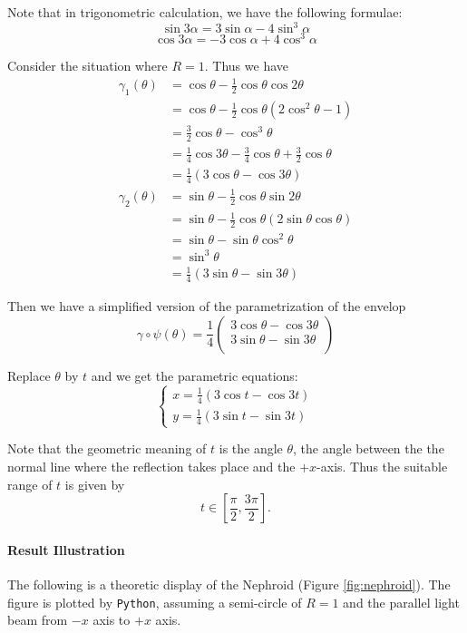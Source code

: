 \documentclass[a4paper]{article}
\begin{document}
Note that in trigonometric calculation, we have the following formulae:
$$\sin 3\alpha = 3\sin \alpha - 4 \sin^3 \alpha$$
$$\cos 3\alpha = -3\cos \alpha + 4 \cos^3 \alpha$$

Consider the situation where $R=1$. Thus we have
\begin{align*}
\gamma_1(\theta) &= \cos \theta - \frac{1}{2}\cos \theta \cos 2\theta\\
&= \cos \theta - \frac{1}{2}\cos \theta (2\cos^2 \theta -1)\\
&= \frac{3}{2}\cos \theta - \cos^3 \theta\\
&= \frac{1}{4}\cos 3\theta -\frac{3}{4}\cos \theta + \frac{3}{2}\cos \theta\\
&= \frac{1}{4}(3\cos \theta - \cos 3\theta)
\end{align*}
\begin{align*}
\gamma_2(\theta) &= \sin \theta - \frac{1}{2}\cos \theta \sin 2\theta\\
&= \sin \theta - \frac{1}{2}\cos \theta (2\sin \theta \cos \theta)\\
&= \sin \theta - \sin \theta \cos^2 \theta\\
&= \sin^3 \theta\\
&= \frac{1}{4}(3\sin \theta - \sin 3\theta)
\end{align*}

Then we have a simplified version of the parametrization of the envelop
$$\gamma \circ \psi(\theta) = \frac{1}{4}
\begin{pmatrix}
3\cos \theta - \cos 3\theta\\
3\sin \theta - \sin 3\theta\\
\end{pmatrix}$$

Replace $\theta$ by $t$ and we get the parametric equations:
\begin{equation*}
\left\lbrace
	\begin{aligned}
	x = \frac{1}{4}(3\cos t - \cos 3t)\\
	y = \frac{1}{4}(3\sin t - \sin 3t)
	\end{aligned}
\right.
\end{equation*}

Note that the geometric meaning of $t$ is the angle $\theta$, the angle between the the normal line where the reflection takes place and the $+x$-axis. Thus the suitable range of $t$ is given by 
$$t \in [\frac{\pi}{2},\frac{3\pi}{2}].$$

\paragraph{Result Illustration}
The following is a theoretic display of the Nephroid (Figure \ref{fig:nephroid}). The figure is plotted by \texttt{Python}, assuming a semi-circle of $R=1$ and the parallel light beam from $-x$ axis to $+x$ axis.
\end{document}
